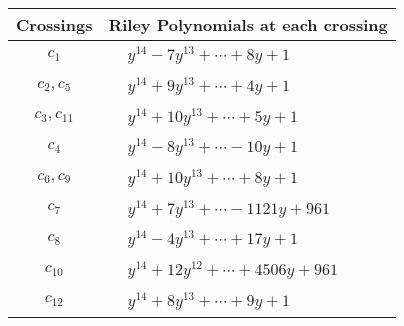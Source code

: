 \documentclass[1p]{elsarticle_modified}
\theoremstyle{definition}
\begin{document}
\begin{tabular}{m{50pt}|m{274pt}}
Crossings & \hspace{64pt}Riley Polynomials at each crossing \\
\hline $$\begin{aligned}c_{1}\end{aligned}$$&$\begin{aligned}
&y^{14}-7 y^{13}+\cdots+8 y+1
\end{aligned}$\\
\hline $$\begin{aligned}c_{2},c_{5}\end{aligned}$$&$\begin{aligned}
&y^{14}+9 y^{13}+\cdots+4 y+1
\end{aligned}$\\
\hline $$\begin{aligned}c_{3},c_{11}\end{aligned}$$&$\begin{aligned}
&y^{14}+10 y^{13}+\cdots+5 y+1
\end{aligned}$\\
\hline $$\begin{aligned}c_{4}\end{aligned}$$&$\begin{aligned}
&y^{14}-8 y^{13}+\cdots-10 y+1
\end{aligned}$\\
\hline $$\begin{aligned}c_{6},c_{9}\end{aligned}$$&$\begin{aligned}
&y^{14}+10 y^{13}+\cdots+8 y+1
\end{aligned}$\\
\hline $$\begin{aligned}c_{7}\end{aligned}$$&$\begin{aligned}
&y^{14}+7 y^{13}+\cdots-1121 y+961
\end{aligned}$\\
\hline $$\begin{aligned}c_{8}\end{aligned}$$&$\begin{aligned}
&y^{14}-4 y^{13}+\cdots+17 y+1
\end{aligned}$\\
\hline $$\begin{aligned}c_{10}\end{aligned}$$&$\begin{aligned}
&y^{14}+12 y^{12}+\cdots+4506 y+961
\end{aligned}$\\
\hline $$\begin{aligned}c_{12}\end{aligned}$$&$\begin{aligned}
&y^{14}+8 y^{13}+\cdots+9 y+1
\end{aligned}$\\
\hline
\end{tabular}\\~\\
\end{document}
